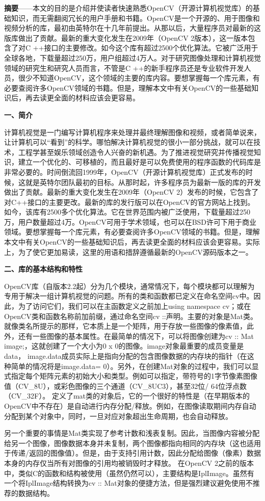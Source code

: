 \documentclass{bjtu-bachelor-thesis}
\begin{document}
\begin{appendices}
\textbf{摘要}——本文的目的是介绍并使读者快速熟悉OpenCV（开源计算机视觉库）的基础知识，而无需翻阅冗长的用户手册和书籍。OpenCV是一个开源的、用于图像和视频分析的库，最初由英特尔在十几年前提出。从那以后，大量程序员对最新的这版库做出了贡献。最新的重大变化发生在2009年（OpenCV 2版本），这一版本包含了对C ++接口的主要修改。如今这个库有超过2500个优化算法。它被广泛用于全球各地，下载量超过250万，用户组超过4万人。对于研究图像处理和计算机视觉领域的研究生和研究人员而言，不管是C ++的新手程序员还是专业软件开发人员，很少不知道OpenCV，这个领域的主要的库内容。要想掌握每一个库元素，有必要查阅许多OpenCV领域的书籍。但是，理解本文中有关OpenCV的一些基础知识后，再去读更全面的材料应该会更容易。\par
\textbf{一、简介} \par
计算机视觉是一门编写计算机程序来处理并最终理解图像和视频，或者简单说来，让计算机可以“看到”的科学。哪怕解决计算机视觉的很小一部分挑战，就可以在技术，工程学甚至娱乐领域创造令人兴奋的新机遇。为了推进视觉研究并传播视觉知识，建立一个优化的、可移植的，而且最好是可以免费使用的程序函数的代码库是非常必要的。时间倒流回1999年，OpenCV（开源计算机视觉库）正式发布的时候，这就是英特尔团队最初的目标。从那时起，许多程序员为最新一版的库的开发做出了贡献。最新的重大变化发生在2009年（OpenCV 2）发布的时候，它包含了对C++接口的主要更改。最新的库的发行版可以在OpenCV的官方网站上找到。如今，该库有2500多个优化算法。它在世界范围内被广泛使用，下载量超过250万，用户数量超过4万。OpenCV可用于学术领域，也可以在BSD许可下用于商业领域。要想掌握每一个库元素，有必要查阅许多OpenCV领域的书籍。但是，理解本文中有关OpenCV的一些基础知识后，再去读更全面的材料应该会更容易。实际上，为了使它更加易读，这里的用语和措辞遵循最新的OpenCV源码版本之一。\par
\textbf{二、库的基本结构和特性} \par
OpenCV库（自版本2.2起）分为几个模块，通常情况下，每个模块都可以理解为专用于解决一组计算机视觉的问题。所有的类和函数都已定义在命名空间cv中。因此，为了访问它们，我们可以在主函数定义之前加上using namespace cv；或在OpenCV类和函数名称前加前缀，通过命名空间cv ::声明。主要的对象是Mat类。就像类名所提示的那样，它本质上是一个矩阵，用于存放一些图像的像素值，此外，还有一些图像的基本属性。在最简单的情况下，可以将图像创建为cv :: Mat image;，这就创建了一个大小为0 x 0的图像。image对象最重要的成员变量是data， image.data成员实际上是指向分配的包含图像数据的内存块的指针（在这种简单的情况将是image.data= 0）。另外，在创建Mat对象的过程中，我们可以显式指定每个矩阵元素的初始大小和类型。例如可以指定，带符号的1字节像素图像值（CV\_8U），或彩色图像的三个通道（CV\_8UC3），甚至32位/ 64位浮点数（CV\_32F）。
定义了mat类的对象后，它的一个很好的特性是（在早期版本的OpenCV中不存在）是自动进行内存分配/释放。例如，在图像读取期间内存自动分配到某个对象中，同时，一旦对应对象超出生命周期，也会自动释放。\par
另一个重要的事情是Mat类实现了参考计数和浅表复制。因此，当图像内容被分配给另一个图像，图像数据本身并未复制，两个图像都指向相同的内存块（这也适用于传递/返回的图像值）。但是，由于支持引用计数，因此分配给图像（像素）数据本身的内存仅当所有对图像的引用均被销毁时才释放。
在OpenCV 2之前的版本中，类似C的函数和结构被使用（虽然仍然可以），主要结构是IplImage。虽然有一个将IplImage结构转换为cv :: Mat对象的便捷方法，但是强烈建议避免使用不推荐的数据结构。\par
\end{appendices}
\end{document}
